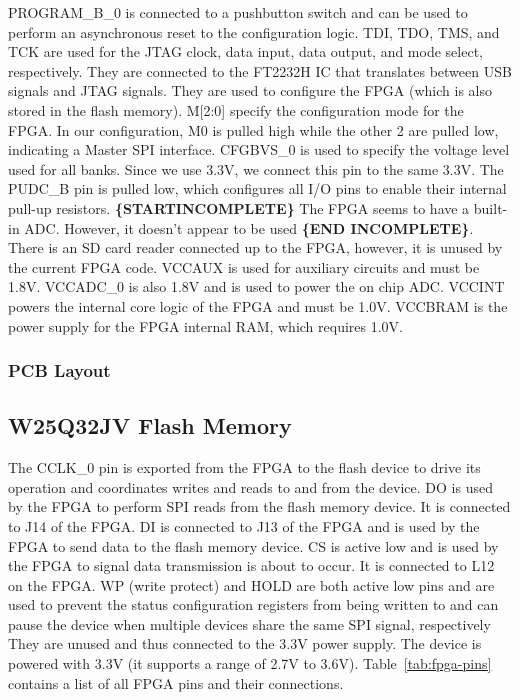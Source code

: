 PROGRAM\_B\_0 is connected to a pushbutton switch and can be used to perform an asynchronous reset
to the configuration logic. TDI, TDO, TMS, and TCK are used for the JTAG clock, data input, data
output, and mode select, respectively. They are connected to the FT2232H IC that translates between
USB signals and JTAG signals. They are used to configure the FPGA (which is also stored in the flash
memory). M[2:0] specify the configuration mode for the FPGA\@. In our configuration, M0 is pulled
high while the other 2 are pulled low, indicating a Master SPI interface. CFGBVS\_0 is used to
specify the voltage level used for all banks. Since we use 3.3V, we connect this pin to the same
3.3V. The PUDC\_B pin is pulled low, which configures all I/O pins to enable their internal pull-up
resistors. \textbf{\{STARTINCOMPLETE\}} The FPGA seems to have a built-in ADC\@. However, it doesn't
appear to be used \textbf{\{END INCOMPLETE\}}. There is an SD card reader connected up to the FPGA,
however, it is unused by the current FPGA code. VCCAUX is used for auxiliary circuits and must be
1.8V. VCCADC\_0 is also 1.8V and is used to power the on chip ADC\@. VCCINT powers the internal core
logic of the FPGA and must be 1.0V. VCCBRAM is the power supply for the FPGA internal RAM, which
requires 1.0V.

\subsubsection{PCB Layout}
\label{sec:xc7a15t-ftg256-pcb}



\subsection{W25Q32JV Flash Memory}
\label{sec:w25q32jv}

The CCLK\_0 pin is exported from the FPGA to the flash device to drive its operation and coordinates
writes and reads to and from the device. DO is used by the FPGA to perform SPI reads from the flash
memory device. It is connected to J14 of the FPGA\@. DI is connected to J13 of the FPGA and is used
by the FPGA to send data to the flash memory device. CS is active low and is used by the FPGA to
signal data transmission is about to occur. It is connected to L12 on the FPGA\@. WP (write protect)
and HOLD are both active low pins and are used to prevent the status configuration registers from
being written to and can pause the device when multiple devices share the same SPI signal,
respectively They are unused and thus connected to the 3.3V power supply. The device is powered with
3.3V (it supports a range of 2.7V to 3.6V). Table~\ref{tab:fpga-pins} contains a list of all FPGA
pins and their connections.

